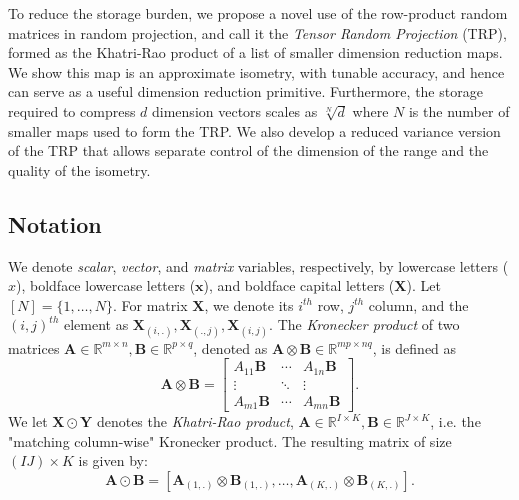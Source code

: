 To reduce the storage burden, we propose a novel use of the row-product random matrices in random projection, and call it the \textit{Tensor Random Projection} (TRP),
formed as the Khatri-Rao product of a list of smaller dimension reduction maps.
We show this map is an approximate isometry, with tunable accuracy,
and hence can serve as a useful dimension reduction primitive.
Furthermore, the storage required to compress $d$ dimension vectors scales as $\sqrt[N]d$
where $N$ is the number of smaller maps used to form the TRP.
We also develop a reduced variance version of the TRP that allows separate control
of the dimension of the range and the quality of the isometry.





\subsection{Notation}
We denote \textit{scalar}, \textit{vector}, and \textit{matrix} variables, respectively,
by lowercase letters ($x$), boldface lowercase letters ($\mathbf{x}$),
and boldface capital letters  ($\mathbf{X}$).
Let $[N] = \{1, \dots, N\}$.
For matrix $\mathbf{X}$, we denote its $i^{th}$ row, $j^{th}$ column, and the $(i,j)^{th}$ element as $\mathbf{X}_{(i,.)}, \mathbf{X}_{(.,j)}, \mathbf{X}_{(i,j)}$. The \textit{Kronecker product} of two matrices $\mathbf{A}\in \mathbb{R}^{m\times n},\mathbf{B} \in \mathbb{R}^{p\times q}$, denoted as $\mathbf{A} \otimes \mathbf{B} \in \mathbb{R}^{mp\times nq}$, is defined as 
\[
\mathbf{A} \otimes \mathbf{B} = \left[
\begin{array}{ccc}
A_{11}\mathbf{B}   & \cdots & A_{1n}\mathbf{B} \\
\vdots & \ddots & \vdots \\
A_{m1}\mathbf{B} & \cdots &   A_{mn}\mathbf{B}
\end{array}
\right].
\]
We let $\mathbf{X} \odot \mathbf{Y}$ denotes the \textit{Khatri-Rao product}, $\mathbf{A} \in \mathbb{R}^{I \times K}, \mathbf{B} \in \mathbb{R}^{J \times K}$, i.e. the "matching column-wise" Kronecker product. The resulting matrix of size $(IJ) \times K$ is given by: 
\begin{equation}\label{khatri-rao}
\mathbf{A} \odot \mathbf{B} = [\mathbf{A}_{(1,.)} \otimes \mathbf{B}_{(1,.)}, \dots, \mathbf{A}_{(K, .)} \otimes \mathbf{B}_{(K,.)}].
\end{equation}

